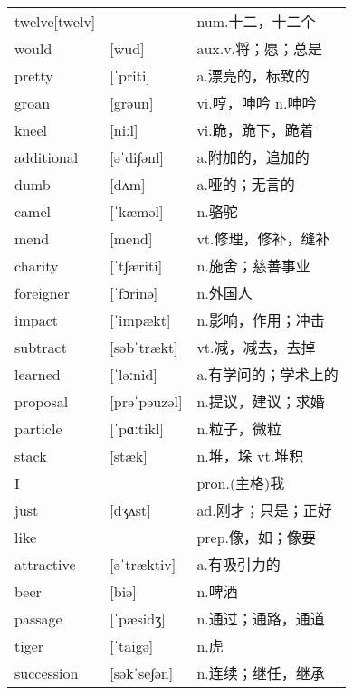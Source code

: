 \documentclass[a4paper]{article}
\begin{document}
\section{}
\begin{tabular}{l l l}

twelve[twelv] &  & num.十二，十二个 \\
would & [wud] & aux.v.将；愿；总是 \\
pretty & [ˈpriti] & a.漂亮的，标致的 \\
groan & [grəun] & vi.哼，呻吟 n.呻吟 \\
kneel & [niːl] & vi.跪，跪下，跪着 \\
additional & [əˈdi∫ənl] & a.附加的，追加的 \\
dumb & [dʌm] & a.哑的；无言的 \\
camel & [ˈkæməl] & n.骆驼 \\
mend & [mend] & vt.修理，修补，缝补 \\
charity & [ˈt∫æriti] & n.施舍；慈善事业 \\
foreigner & [ˈfɔrinə] & n.外国人 \\
impact & [ˈimpækt] & n.影响，作用；冲击 \\
subtract & [səbˈtrækt] & vt.减，减去，去掉 \\
learned & [ˈləːnid] & a.有学问的；学术上的 \\
proposal & [prəˈpəuzəl] & n.提议，建议；求婚 \\
particle & [ˈpɑːtikl] & n.粒子，微粒 \\
stack & [stæk] & n.堆，垛 vt.堆积 \\
I &  & pron.(主格)我 \\
just & [dʒʌst] & ad.刚才；只是；正好 \\
like &  & prep.像，如；像要 \\
attractive & [əˈtræktiv] & a.有吸引力的 \\
beer & [biə] & n.啤酒 \\
passage & [ˈpæsidʒ] & n.通过；通路，通道 \\
tiger & [ˈtaigə] & n.虎 \\
succession & [səkˈse∫ən] & n.连续；继任，继承 \\

\end{tabular}
\end{document}
